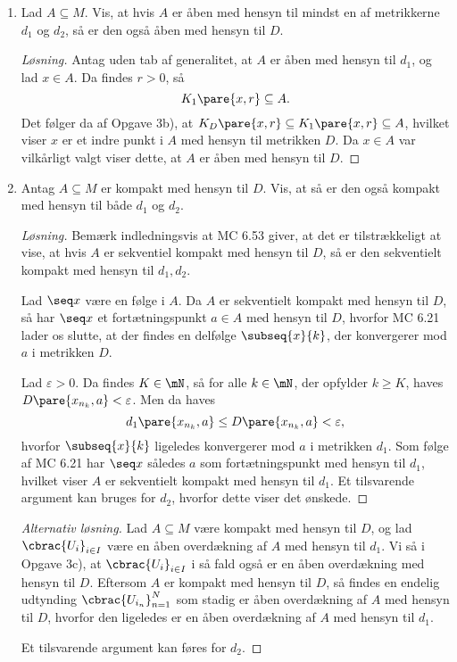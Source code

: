 \begin{opg}
\begin{enumerate}
\begin{proof}[Løsning]
Lad nu $x\in K_1\pare{a,r}\cap K_2\pare{a,s}$, og antag uden tab af generalitet $D\pare{x,a} = d_1\pare{x,a}$. Da haves
$$ D\pare{x,a} = d_1\pare{x,a} < r \leq \max\cbrac{r,s}, $$
hvilket viser den anden inklusion.
\end{proof}

\item
Lad $A\subseteq M$. Vis, at hvis $A$ er åben med hensyn til mindst en af metrikkerne $d_1$ og $d_2$, så er den også
åben med hensyn til $D$.

\begin{proof}[Løsning]
Antag uden tab af generalitet, at $A$ er åben med hensyn til $d_1$, og lad $x\in A$. Da findes $r>0$, så
$$ K_1\pare{x,r} \subseteq A. $$
Det følger da af Opgave 3b), at $K_D\pare{x,r}\subseteq K_1\pare{x,r} \subseteq A$, hvilket viser $x$ er et indre punkt i $A$ med hensyn til metrikken $D$. Da $x\in A$ var vilkårligt valgt viser dette, at $A$ er åben med hensyn til $D$.
\end{proof}

\item
Antag $A\subseteq M$ er kompakt med hensyn til $D$. Vis, at så er den også kompakt med hensyn til både
$d_1$ og $d_2$.

\begin{proof}[Løsning]
Bemærk indledningsvis at MC 6.53 giver, at det er tilstrækkeligt at vise, at hvis $A$ er sekventiel kompakt med hensyn til $D$, så er den sekventielt kompakt med hensyn til $d_1,d_2$. 

Lad $\seq x$ være en følge i $A$. Da $A$ er sekventielt kompakt med hensyn til $D$, så har $\seq x$ et fortætningspunkt $a\in A$ med hensyn til $D$, hvorfor MC 6.21 lader os slutte, at der findes en delfølge $\subseq{x}{k}$, der konvergerer mod $a$ i metrikken $D$.

Lad $\varepsilon>0$. Da findes $K\in\mN$, så for alle $k\in\mN$, der opfylder $k\geq K$, haves $D\pare{x_{n_k},a} < \varepsilon$. Men da haves
$$ d_1\pare{x_{n_k},a} \leq D\pare{x_{n_k},a} < \varepsilon, $$
hvorfor $\subseq{x}{k}$ ligeledes konvergerer mod $a$ i metrikken $d_1$. Som følge af MC 6.21 har $\seq x$ således $a$ som fortætningspunkt med hensyn til $d_1$, hvilket viser $A$ er sekventielt kompakt med hensyn til $d_1$. Et tilsvarende argument kan bruges for $d_2$, hvorfor dette viser det ønskede.
\end{proof}

\begin{proof}[Alternativ løsning]
Lad $A\subseteq M$ være kompakt med hensyn til $D$, og lad $\cbrac{U_i}_{i\in I}$ være en åben overdækning af $A$ med hensyn til $d_1$. Vi så i Opgave 3c), at $\cbrac{U_i}_{i\in I}$ i så fald også er en åben overdækning med hensyn til $D$. Eftersom $A$ er kompakt med hensyn til $D$, så findes en endelig udtynding $\cbrac{U_{i_n}}_{n=1}^N$ som stadig er åben overdækning af $A$ med hensyn til $D$, hvorfor den ligeledes er en åben overdækning af $A$ med hensyn til $d_1$. 

Et tilsvarende argument kan føres for $d_2$.
\end{proof}

\end{enumerate}
\end{opg}